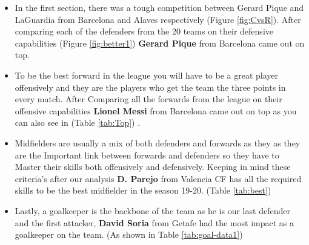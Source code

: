 \documentclass[11pt,a4paper,]{article}
\begin{document}
\begin{itemize}
\item
  In the first section, there was a tough competition between Gerard Pique and LaGuardia from Barcelona and Alaves respectively (Figure \ref{fig:CvsR}). After comparing each of the defenders from the 20 teams on their defensive capabilities (Figure \ref{fig:better1}) \textbf{Gerard Pique} from Barcelona came out on top.
\item
  To be the best forward in the league you will have to be a great player offensively and they are the players who get the team the three points in every match. After Comparing all the forwards from the league on their offensive capabilities \textbf{Lionel Messi} from Barcelona came out on top as you can also see in (Table \ref{tab:Top}) .
\item
  Midfielders are usually a mix of both defenders and forwards as they as they are the Important link between forwards and defenders so they have to Master their skills both offensively and defensively. Keeping in mind these criteria's after our analysis \textbf{D. Parejo} from Valencia CF has all the required skills to be the best midfielder in the season 19-20. (Table \ref{tab:best})
\item
  Lastly, a goalkeeper is the backbone of the team as he is our last defender and the first attacker, \textbf{David Soria} from Getafe had the most impact as a goalkeeper on the team. (As shown in Table \ref{tab:goal-data1})
\end{itemize}

\printbibliography
\end{document}
